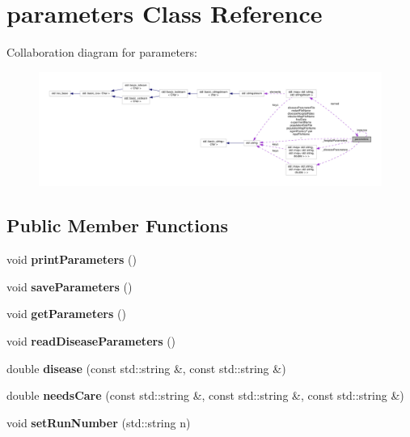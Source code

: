 \hypertarget{classparameters}{}\section{parameters Class Reference}
\label{classparameters}


Collaboration diagram for parameters\+:
\nopagebreak
\begin{figure}[H]
\begin{center}
\leavevmode
\includegraphics[width=350pt]{classparameters__coll__graph}
\end{center}
\end{figure}
\subsection*{Public Member Functions}
\begin{DoxyCompactItemize}
\item 
\mbox{\label{classparameters_a5afb6f0a6eeec826d39795add97c2891}} 
void {\bfseries print\+Parameters} ()
\item 
\mbox{\label{classparameters_a1f9a3b98c893d21631f9611202ba4ad6}} 
void {\bfseries save\+Parameters} ()
\item 
\mbox{\label{classparameters_a62f7b648c3c5c5b71894cdb9825ec5ed}} 
void {\bfseries get\+Parameters} ()
\item 
\mbox{\label{classparameters_a3c25eaa213291dce9de11ace386770a5}} 
void {\bfseries read\+Disease\+Parameters} ()
\item 
\mbox{\label{classparameters_a29ec80156af04d3729397f122717e4df}} 
double {\bfseries disease} (const std\+::string \&, const std\+::string \&)
\item 
\mbox{\label{classparameters_a44a495028fba207fe2de8b2a4d3cae61}} 
double {\bfseries needs\+Care} (const std\+::string \&, const std\+::string \&, const std\+::string \&)
\item 
\mbox{\label{classparameters_ac12f6a6ab14a6f5ce5f48e4c535f3e03}} 
void {\bfseries set\+Run\+Number} (std\+::string n)
\end{DoxyCompactItemize}
